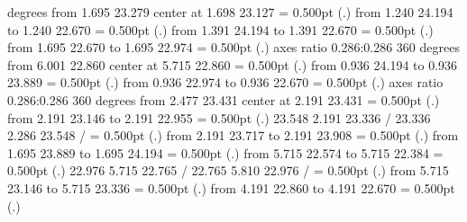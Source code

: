 {{\color[rgb]{0,0,0} degrees from  1.695 23.279 center at  1.698 23.127
}%
%
%
\linethickness= 0.500pt
\setplotsymbol ({\thinlinefont .})
{\color[rgb]{0,0,0}\putrule from  1.240 24.194 to  1.240 22.670
}%
%
%
\linethickness= 0.500pt
\setplotsymbol ({\thinlinefont .})
{\color[rgb]{0,0,0}\putrule from  1.391 24.194 to  1.391 22.670
}%
%
%
\linethickness= 0.500pt
\setplotsymbol ({\thinlinefont .})
{\color[rgb]{0,0,0}\putrule from  1.695 22.670 to  1.695 22.974
}%
%
%
\linethickness= 0.500pt
\setplotsymbol ({\thinlinefont .})
{\color[rgb]{0,0,0}\ellipticalarc axes ratio  0.286:0.286  360 degrees 
	from  6.001 22.860 center at  5.715 22.860
}%
%
%
\linethickness= 0.500pt
\setplotsymbol ({\thinlinefont .})
{\color[rgb]{0,0,0}\putrule from  0.936 24.194 to  0.936 23.889
}%
%
%
\linethickness= 0.500pt
\setplotsymbol ({\thinlinefont .})
{\color[rgb]{0,0,0}\putrule from  0.936 22.974 to  0.936 22.670
}%
%
%
\linethickness= 0.500pt
\setplotsymbol ({\thinlinefont .})
{\color[rgb]{0,0,0}\ellipticalarc axes ratio  0.286:0.286  360 degrees 
	from  2.477 23.431 center at  2.191 23.431
}%
%
%
\linethickness= 0.500pt
\setplotsymbol ({\thinlinefont .})
{\color[rgb]{0,0,0}\putrule from  2.191 23.146 to  2.191 22.955
}%
%
%
\linethickness= 0.500pt
\setplotsymbol ({\thinlinefont .})
{\color[rgb]{0,0,0} 23.548  2.191 23.336 /
 23.336  2.286 23.548 /
}%
%
%
\linethickness= 0.500pt
\setplotsymbol ({\thinlinefont .})
{\color[rgb]{0,0,0}\putrule from  2.191 23.717 to  2.191 23.908
}%
%
%
\linethickness= 0.500pt
\setplotsymbol ({\thinlinefont .})
{\color[rgb]{0,0,0}\putrule from  1.695 23.889 to  1.695 24.194
}%
%
%
\linethickness= 0.500pt
\setplotsymbol ({\thinlinefont .})
{\color[rgb]{0,0,0}\putrule from  5.715 22.574 to  5.715 22.384
}%
%
%
\linethickness= 0.500pt
\setplotsymbol ({\thinlinefont .})
{\color[rgb]{0,0,0} 22.976  5.715 22.765 /
 22.765  5.810 22.976 /
}%
%
%
\linethickness= 0.500pt
\setplotsymbol ({\thinlinefont .})
{\color[rgb]{0,0,0}\putrule from  5.715 23.146 to  5.715 23.336
}%
%
%
\linethickness= 0.500pt
\setplotsymbol ({\thinlinefont .})
{\color[rgb]{0,0,0}\putrule from  4.191 22.860 to  4.191 22.670
}%
%
%
\linethickness= 0.500pt
\setplotsymbol ({\thinlinefont .})
}

